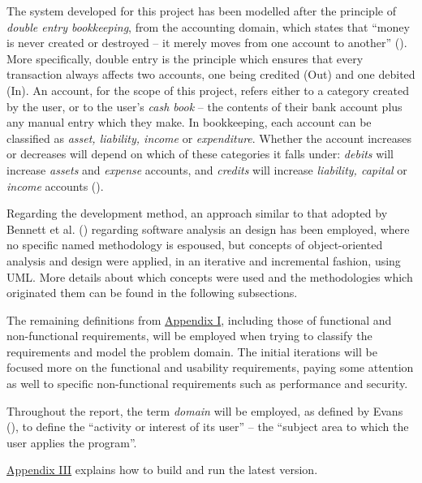 The system developed for this project has been modelled after the principle of
\emph{double entry bookkeeping}, from the accounting domain, which states that
``money is never created or destroyed -- it merely moves from one account to
another'' (\cite[][Section 6.2]{fowler1997analysis}). More specifically, double
entry is the principle which ensures that every transaction always affects two
accounts, one being credited (Out) and one debited (In). An account, for the
scope of this project, refers either to a category created by the user, or to
the user's \emph{cash book} -- the contents of their bank account plus any
manual entry which they make. In bookkeeping, each account can be classified as
\emph{asset, liability, income} or \emph{expenditure}. Whether the account
increases or decreases will depend on which of these categories it falls under:
\emph{debits} will increase \emph{assets} and \emph{expense} accounts, and
\emph{credits} will increase \emph{liability, capital} or \emph{income}
accounts (\cite[][pp.~18-19]{wood2004book}).


Regarding the development method, an approach similar to that adopted by
Bennett et al.  (\citeyear[][p.~77]{bennett2010object}) regarding software
analysis an design has been employed, where no specific named methodology is
espoused, but concepts of object-oriented analysis and design were applied, in
an iterative and incremental fashion, using UML. More details about which
concepts were used and the methodologies which originated them can be found in
the following subsections.


The remaining definitions from \hyperref[appendix1]{Appendix I}, including
those of functional and non-functional requirements, will be employed when
trying to classify the requirements and model the problem domain. The initial
iterations will be focused more on the functional and usability requirements,
paying some attention as well to specific non-functional requirements such as
performance and security.

Throughout the report, the term \emph{domain} will be employed, as defined by
Evans (\citeyear[][p.~2]{evans2004domain}), to define the ``activity or
interest of its user'' -- the ``subject area to which the user applies the
program''. 

\hyperref[appendix3]{Appendix III} explains how to build and run the latest
version.
